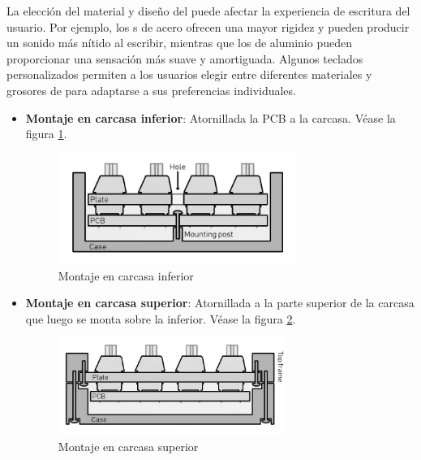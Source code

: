 La elección del material y diseño del  puede afectar la experiencia de escritura del usuario. Por ejemplo, los s de acero ofrecen una mayor rigidez y pueden producir un sonido más nítido al escribir, mientras que los  de aluminio pueden proporcionar una sensación más suave y amortiguada. Algunos teclados personalizados permiten a los usuarios elegir entre diferentes materiales y grosores de  para adaptarse a sus preferencias individuales.

\begin{itemize}
    \item \textbf{Montaje en carcasa inferior}: Atornillada la \gls{PCB} a la carcasa. Véase  la figura \ref{fig:Montaje1}.
    \begin{figure}[H]
        \centering
        \includegraphics[width=0.73\textwidth]{imagenes/Capitulos/Cap03/Montajes/Montaje1.png}
        \caption{Montaje en carcasa inferior \cite{Keyboards-Mounting-Styles}}
        \label{fig:Montaje1}
    \end{figure}
    
    \item \textbf{Montaje en carcasa superior}: Atornillada a la parte superior de la carcasa que luego se monta sobre la inferior. Véase  la figura \ref{fig:Montaje2}.
    \begin{figure}[H]
        \centering
        \includegraphics[width=0.7\textwidth]{imagenes/Capitulos/Cap03/Montajes/Montaje2.png}
        \caption{Montaje en carcasa superior \cite{Keyboards-Mounting-Styles}}
        \label{fig:Montaje2}
    \end{figure}
    

\end{itemize}
